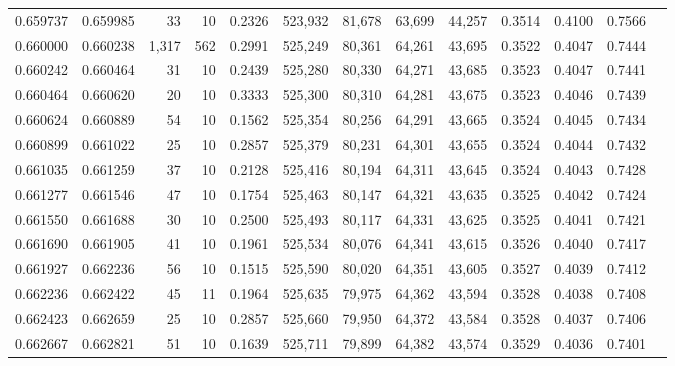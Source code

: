 \begin{tabular}{rrrrrrrrrrrrr}
0.659737 & 0.659985 &    33 &  10 &                                     0.2326 & 523,932 &  81,678 &  63,699 &  44,257 & 0.3514 & 0.4100 & 0.7566 \\
0.660000 & 0.660238 & 1,317 & 562 &                                     0.2991 & 525,249 &  80,361 &  64,261 &  43,695 & 0.3522 & 0.4047 & 0.7444 \\
0.660242 & 0.660464 &    31 &  10 &                                     0.2439 & 525,280 &  80,330 &  64,271 &  43,685 & 0.3523 & 0.4047 & 0.7441 \\
0.660464 & 0.660620 &    20 &  10 &                                     0.3333 & 525,300 &  80,310 &  64,281 &  43,675 & 0.3523 & 0.4046 & 0.7439 \\
0.660624 & 0.660889 &    54 &  10 &                                     0.1562 & 525,354 &  80,256 &  64,291 &  43,665 & 0.3524 & 0.4045 & 0.7434 \\
0.660899 & 0.661022 &    25 &  10 &                                     0.2857 & 525,379 &  80,231 &  64,301 &  43,655 & 0.3524 & 0.4044 & 0.7432 \\
0.661035 & 0.661259 &    37 &  10 &                                     0.2128 & 525,416 &  80,194 &  64,311 &  43,645 & 0.3524 & 0.4043 & 0.7428 \\
0.661277 & 0.661546 &    47 &  10 &                                     0.1754 & 525,463 &  80,147 &  64,321 &  43,635 & 0.3525 & 0.4042 & 0.7424 \\
0.661550 & 0.661688 &    30 &  10 &                                     0.2500 & 525,493 &  80,117 &  64,331 &  43,625 & 0.3525 & 0.4041 & 0.7421 \\
0.661690 & 0.661905 &    41 &  10 &                                     0.1961 & 525,534 &  80,076 &  64,341 &  43,615 & 0.3526 & 0.4040 & 0.7417 \\
0.661927 & 0.662236 &    56 &  10 &                                     0.1515 & 525,590 &  80,020 &  64,351 &  43,605 & 0.3527 & 0.4039 & 0.7412 \\
0.662236 & 0.662422 &    45 &  11 &                                     0.1964 & 525,635 &  79,975 &  64,362 &  43,594 & 0.3528 & 0.4038 & 0.7408 \\
0.662423 & 0.662659 &    25 &  10 &                                     0.2857 & 525,660 &  79,950 &  64,372 &  43,584 & 0.3528 & 0.4037 & 0.7406 \\
0.662667 & 0.662821 &    51 &  10 &                                     0.1639 & 525,711 &  79,899 &  64,382 &  43,574 & 0.3529 & 0.4036 & 0.7401 \\

\end{tabular}
